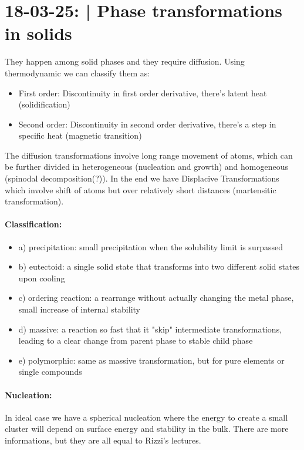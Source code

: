 \section{18-03-25: | Phase transformations in solids}

They happen among solid phases and they require diffusion. Using thermodynamic we can classify them as:
\begin{itemize}
    \item First order: Discontinuity in first order derivative, there's latent heat (solidification)
    \item Second order: Discontinuity in second order derivative, there's a step in specific heat (magnetic transition)
\end{itemize}
The diffusion transformations involve long range movement of atoms, which can be further divided in heterogeneous (nucleation and growth) and homogeneous (spinodal decomposition(?)). In the end we have Displacive Transformations which involve shift of atoms but over relatively short distances (martensitic transformation).

\paragraph{Classification:} 
\begin{itemize}
    \item a) precipitation: small precipitation when the solubility limit is surpassed
    \item b) eutectoid: a single solid state that transforms into two different solid states upon cooling 
    \item c) ordering reaction: a rearrange without actually changing the metal phase, small increase of internal stability
    \item d) massive: a reaction so fast that it "skip" intermediate transformations, leading to a clear change from parent phase to stable child phase
    \item e) polymorphic: same as massive transformation, but for pure elements or single compounds
\end{itemize}

\paragraph{Nucleation:} In ideal case we have a spherical nucleation where the energy to create a small cluster will depend on surface energy and stability in the bulk. 
There are more informations, but they are all equal to Rizzi's lectures. 